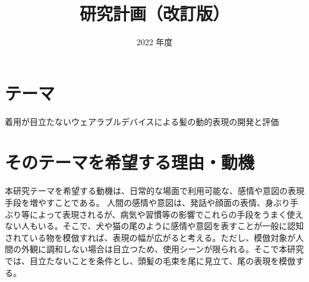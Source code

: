 \documentclass[a4paper]{jsarticle}
\begin{document}
\masterthesis %


\title{研究計画（改訂版）}
\date{2022 年度}
\maketitle


\setcounter{page}{1} %



\newpage

\setcounter{page}{1} %


\section{テーマ}
着用が目立たないウェアラブルデバイスによる髪の動的表現の開発と評価

\section{そのテーマを希望する理由・動機}
本研究テーマを希望する動機は、日常的な場面で利用可能な、感情や意図の表現手段を増やすことである。
人間の感情や意図は、発話や顔面の表情、身ぶり手ぶり等によって表現されるが、病気や習慣等の影響でこれらの手段をうまく使えない人もいる。そこで、犬や猫の尾のように感情や意図を表すことが一般に認知されている物を模倣すれば、表現の幅が広がると考える。ただし、模倣対象が人間の外観に調和しない場合は目立つため、使用シーンが限られる。そこで本研究では、目立たないことを条件とし、頭髪の毛束を尾に見立て、尾の表現を模倣する。
\end{document}
